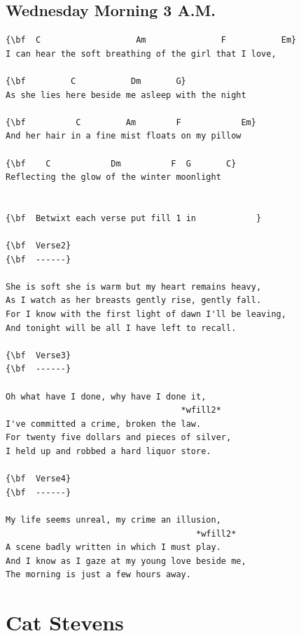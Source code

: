 \documentclass[a4paper]{article}
\begin{document}
\subsection{Wednesday Morning 3 A.M.}
\begin{Verbatim}[commandchars=\\\{\}]
{\bf  C                   Am               F           Em}
I can hear the soft breathing of the girl that I love,

{\bf         C           Dm       G}
As she lies here beside me asleep with the night

{\bf          C         Am        F            Em}
And her hair in a fine mist floats on my pillow

{\bf    C            Dm          F  G       C}
Reflecting the glow of the winter moonlight


{\bf  Betwixt each verse put fill 1 in            }

{\bf  Verse2}
{\bf  ------}

She is soft she is warm but my heart remains heavy,
As I watch as her breasts gently rise, gently fall.
For I know with the first light of dawn I'll be leaving,
And tonight will be all I have left to recall.

{\bf  Verse3}
{\bf  ------}

Oh what have I done, why have I done it,
                                   *wfill2*
I've committed a crime, broken the law.
For twenty five dollars and pieces of silver,
I held up and robbed a hard liquor store.

{\bf  Verse4}
{\bf  ------}

My life seems unreal, my crime an illusion,
                                      *wfill2*
A scene badly written in which I must play.
And I know as I gaze at my young love beside me,
The morning is just a few hours away.

\end{Verbatim}
\newpage
\section{Cat Stevens}
\end{document}
